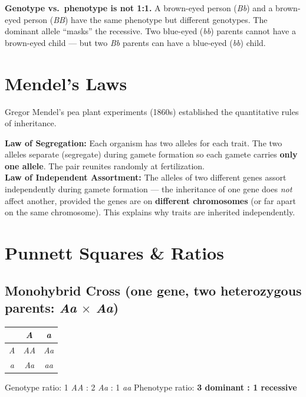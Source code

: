 \documentclass[11pt, letterpaper]{article}
\begin{document}
\begin{tcolorbox}[colback=craapbg, colframe=craapborder, arc=3pt, boxrule=1pt]
\textbf{Genotype vs.\ phenotype is not 1:1.} A brown-eyed person (\textit{Bb}) and a brown-eyed
person (\textit{BB}) have the same phenotype but different genotypes. The dominant allele
``masks'' the recessive. Two blue-eyed (\textit{bb}) parents cannot have a brown-eyed child
--- but two \textit{Bb} parents can have a blue-eyed (\textit{bb}) child.
\end{tcolorbox}

\section*{Mendel's Laws}

Gregor Mendel's pea plant experiments (1860s) established the quantitative rules of inheritance.

\begin{tcolorbox}[colback=part3bg, colframe=sectionpurple, arc=3pt, boxrule=1pt]
\textbf{Law of Segregation:} Each organism has two alleles for each trait. The two alleles
separate (segregate) during gamete formation so each gamete carries \textbf{only one allele}.
The pair reunites randomly at fertilization. \\[4pt]
\textbf{Law of Independent Assortment:} The alleles of two different genes assort independently
during gamete formation --- the inheritance of one gene does \emph{not} affect another, provided
the genes are on \textbf{different chromosomes} (or far apart on the same chromosome). This
explains why traits are inherited independently.
\end{tcolorbox}

\section*{Punnett Squares \& Ratios}

\subsection*{Monohybrid Cross (one gene, two heterozygous parents: \textit{Aa} $\times$ \textit{Aa})}
\begin{center}
\renewcommand{\arraystretch}{1.4}
\begin{tabular}{c|cc}
         & \textit{A}  & \textit{a}  \\
\hline
\textit{A} & \textit{AA} & \textit{Aa} \\
\textit{a} & \textit{Aa} & \textit{aa} \\
\end{tabular}
\end{center}
Genotype ratio: 1 \textit{AA} : 2 \textit{Aa} : 1 \textit{aa}\quad
Phenotype ratio: \textbf{3 dominant : 1 recessive}
\end{document}

